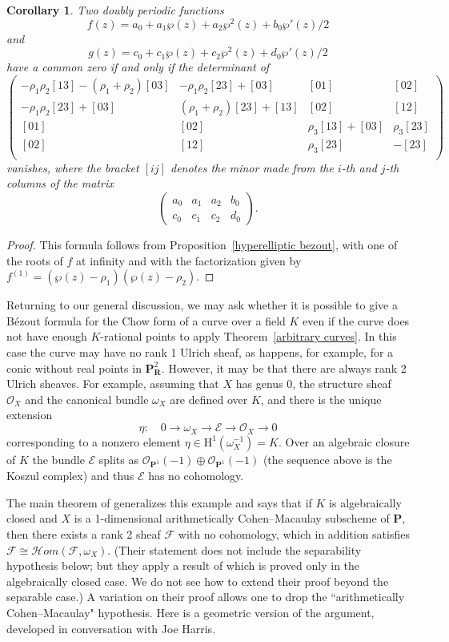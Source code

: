 \documentclass{jams-l}
\newtheorem{corollary}[theorem]{Corollary}
\theoremstyle{definition}
\theoremstyle{remark}
\newcommand{\cE} {{\mathcal E}}
\newcommand{\F}{{\mathcal F}}
\newcommand{\Hrm}{{\mathrm H}}
\newcommand{\cH}{{\mathcal H}}
\newcommand{\Ocal}{{\mathcal O}}
\newcommand{\PP}{{\mathbf P}}
\newcommand{\iso}{\cong}
\begin{document}
\begin{corollary}\label{doubly periodic} 
Two doubly periodic functions
\[
f(z)= a_0+a_1 \wp(z) + a_2 \wp^2(z)+ b_0 \wp'(z)/2
\]
and 
\[
g(z)= c_0+c_1 \wp(z) + c_2 \wp^2(z)+ d_0 \wp'(z)/2\]
have a common zero if and only if the determinant of
\[
\begin{pmatrix}
-\rho_1 \rho_2 [13]-(\rho_1+\rho_2) [03]&
      -\rho_1 \rho_2 [23]+[03]&
      [01]&
      [02]\\
      -\rho_1 \rho_2 [23]+[03]&
      (\rho_1+\rho_2) [23]+[13]&
      [02]&
      [12]\\
      [01]&
      [02]&
      \rho_3 [13]+[03]&
      \rho_3 [23]\\
      [02]&
      [12]&
      \rho_3 [23]&
      -[23]\\
      \end{pmatrix}\]
vanishes, where the bracket
$
[ij]
$ 
denotes the minor made from the $i$-th and $j$-th
columns of the matrix
\[
\begin{pmatrix}
 a_0 & a_1 & a_2 & b_0 \\  
c_0 & c_1 & c_2 & d_0
\end{pmatrix}.
\]
\end{corollary}

\begin{proof}
This formula follows from Proposition~\ref{hyperelliptic bezout},
with one of the roots of $f$ at infinity and with the 
factorization given by $f^{(1)}= (\wp(z)-\rho_1)(\wp(z)-\rho_2)$.
\end{proof}
 
Returning to our general discussion, we may ask whether it
is possible to give a B\'ezout formula for the Chow
form of a curve over a field $K$ even if the curve does not have enough
$K$-rational
points to apply Theorem~\ref{arbitrary curves}. In this case the curve
may have no rank 1
Ulrich sheaf, as happens, for example, for a conic without real points in 
$\PP^2_{\mathbf R}$. However, it may be that there are always rank 2 Ulrich sheaves.
For example, assuming that $X$ has genus 0, 
the  structure sheaf $\Ocal_X$ and the canonical bundle $\omega_X$
 are defined over $K$, and there is the unique
extension 
\[
\eta:\quad 0\to \omega_X\to \cE \to \Ocal_X\to 0
\]
corresponding to a nonzero element $\eta\in \Hrm^1(\omega_X^{-1}) = K$.
Over an algebraic closure of $K$ the bundle $\cE$ splits as
$\Ocal_{\PP^1}(-1)\oplus \Ocal_{\PP^1}(-1)$ (the sequence above
is the Koszul complex) and thus $\cE$ has no cohomology.

The main theorem of \cite{Brennanetal.1987} generalizes
this example and 
says that if $K$ is algebraically closed and 
$X$ is a 1-dimensional arithmetically Cohen--Macaulay subscheme
of $\PP$, then there exists a rank 2 sheaf $\F$ with no cohomology, 
which in addition
satisfies $\F\iso\cH om(\F, \omega_X)$.
(Their statement does not include the separability hypothesis
below; but they apply a result
of \cite{Eisenbud 1988} which is proved only in the
algebraically closed case. We do not see how to extend their
proof beyond the separable case.)
A variation
on their proof allows one to drop the ``arithmetically Cohen--Macaulay"
hypothesis. Here is a geometric version of the argument, 
developed in conversation with Joe Harris. 
\end{document}
